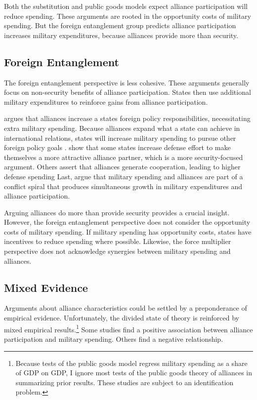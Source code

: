 \documentclass[12pt]{article}
\begin{document}
Both the substitution and public goods models expect alliance participation will reduce spending. 
These arguments are rooted in the opportunity costs of military spending. 
But the foreign entanglement group predicts alliance participation increases military expenditures, because alliances provide more than security. 


\subsection{Foreign Entanglement}


The foreign entanglement perspective is less cohesive.
These arguments generally focus on non-security benefits of alliance participation. 
States then use additional military expenditures to reinforce gains from alliance participation. 


\citet{Diehl1994} argues that alliances increase a states foreign policy responsibilities, necessitating extra military spending. 
Because alliances expand what a state can achieve in international relations, states will increase military spending to pursue other foreign policy goals \citep{MorganPalmer2006}. 
\citet{Horowitzetal2017} show that some states increase defense effort to make themselves a more attractive alliance partner, which is a more security-focused argument. 
Others assert that alliances generate cooperation, leading to higher defense spending \citep{Palmer1990, QuirozFlores2011}
Last, \citet{SeneseVasquez2008} argue that military spending and alliances are part of a conflict spiral that produces simultaneous growth in military expenditures and alliance participation. 


Arguing alliances do more than provide security provides a crucial insight.
However, the foreign entanglement perspective does not consider the opportunity costs of military spending. 
If military spending has opportunity costs, states have incentives to reduce spending where possible.  
Likewise, the force multiplier perspective does not acknowledge synergies between military spending and alliances. 


\subsection{Mixed Evidence} 


Arguments about alliance characteristics could be settled by a preponderance of empirical evidence. 
Unfortunately, the divided state of theory is reinforced by mixed empirical results.\footnote{Because tests of the public goods model regress military spending as a share of GDP on GDP, I ignore most tests of the public goods theory of alliances in summarizing prior results. These studies are subject to an identification problem.}
Some studies find a positive association between alliance participation and military spending. 
Others find a negative relationship. 
\end{document}
